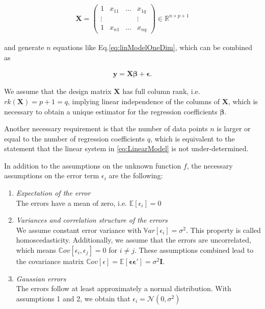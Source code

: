 \documentclass[10pt,a4paper]{article}
\begin{document}
\begin{align}
	\boldsymbol{X} = \begin{pmatrix}   1     & x_{11} & \dots & x_{1q} \\ 
								  	  \vdots &        &       & \vdots \\ 
				  		  			   1     & x_{n1} & \dots & x_{nq}  
		\end{pmatrix} \in \mathbb{R}^{n \times p+1}		
\end{align}

and generate $n$ equations like Eq.\ref{eq:linModelOneDim}, which can be combined as 

\begin{align} \label{eq:LinearModel}
	\boldsymbol{y} = \boldsymbol{X}\boldsymbol{\beta} + \boldsymbol{\epsilon}.
\end{align}

We assume that the design matrix $\boldsymbol{X}$ has full column rank, i.e. $rk(\boldsymbol{X}) = p + 1 = q$, implying linear independence of the columns of $\boldsymbol{X}$, which is necessary to obtain a unique estimator for the regression coefficients $\boldsymbol{\beta}$. \cite{fahrmeir2013regression}

Another necessary requirement is that the number of data points $n$ is larger or equal to the number of regression coefficients $q$, which is equivalent to the statement that the linear system in \ref{eq:LinearModel} is not under-determined.

In addition to the assumptions on the unknown function $f$, the necessary assumptions on the error term $\epsilon_i$ are the following:

\begin{enumerate}
	\item \emph{Expectation of the error} \\
	The errors have a mean of zero, i.e. $\mathbb E[\epsilon_i] = 0$

	\item \emph{Variances and correlation structure of the errors} \\
	We assume constant error variance with $\mathbb Var[\epsilon_i] = \sigma^2$. This property is called homoscedasticity. Additionally, we assume that the errors are uncorrelated, which means $\mathbb Cov[\epsilon_i, \epsilon_j] = 0$ for $i \ne j$. These assumptions combined lead to the covariance matrix $\mathbb Cov[\epsilon] = \mathbb E[\boldsymbol{\epsilon} \boldsymbol{\epsilon}'] = \sigma^2 \boldsymbol{I}$.

	\item \emph{Gaussian errors} \\
	The errors follow at least approximately a normal distribution. With assumptions 1 and 2, we obtain that $\epsilon_i = \mathcal N(0, \sigma^2)$ 
\end{enumerate}
\end{document}

